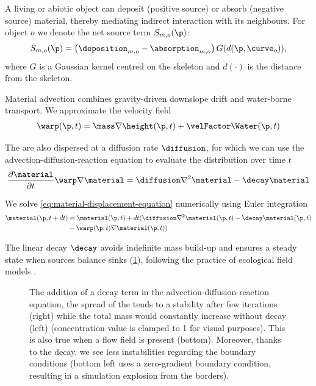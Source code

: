 A living or abiotic object can deposit (positive source) or absorb (negative source) material, thereby mediating indirect interaction with its neighbours.  For object $o$ we denote the net source term $S_{m,o}(\p)$:
\begin{align}
    S_{m,o}(\p) = \left(\deposition_{m,o} - \absorption_{m,o}\right) G(d(\p,\curve_o)),
\end{align}
where $G$ is a Gaussian kernel centred on the skeleton and $d(\cdot)$ is the distance from the skeleton.


Material advection combines gravity-driven downslope drift and water-borne transport.  We approximate the velocity field
\begin{align}
    \warp(\p, t) = \mass \nabla \height(\p, t) + \velFactor \Water(\p, t)
\end{align}

The  are also dispersed at a diffusion rate $\diffusion$, for which we can use the advection-diffusion-reaction equation to evaluate the distribution over time $t$
\begin{align} 
	\label{eq:material-displacement-equation}
    \frac{\partial \material}{\partial t} \warp \nabla \material = \diffusion \nabla^2 \material - \decay \material
\end{align}

We solve \eqref{eq:material-displacement-equation} numerically using Euler integration
\begin{align}
    \material(\p, t + dt) &= \material(\p, t) + dt ( \diffusion \nabla^2 \material(\p, t) - \decay \material(\p, t) \\ & - \warp(\p, t) \nabla \material(\p, t) ) \nonumber
\end{align}

The linear decay $\decay$ avoids indefinite mass build-up and ensures a steady state when sources balance sinks (\cref{fig:env-obj_stability-examples}), following the practice of ecological field models \cite{Seidl2012}.

\begin{figure}[H]
    \centering
    \caption{The addition of a decay term in the advection-diffusion-reaction equation, the spread of the  tends to a stability after few iterations (right) while the total mass would constantly increase without decay (left) (concentration value is clamped to 1 for visual purposes). This is also true when a flow field is present (bottom). Moreover, thanks to the decay, we see less instabilities regarding the boundary conditions (bottom left uses a zero-gradient boundary condition, resulting in a simulation explosion from the borders). }
    \label{fig:env-obj_stability-examples}
\end{figure}



